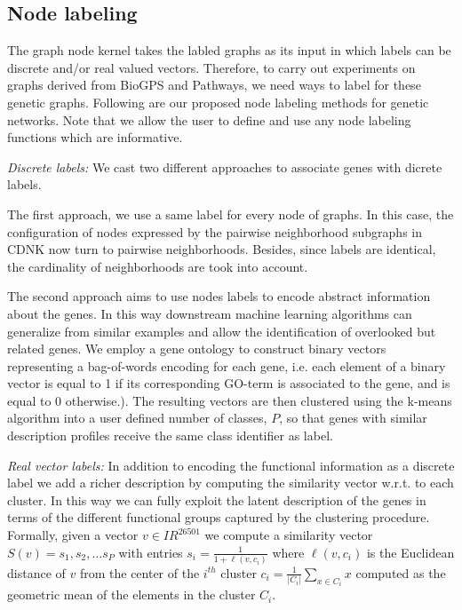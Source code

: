 \documentclass[review]{elsarticle}
\begin{document}
\subsection{Node labeling} 
\label{sec:lab}
The graph node kernel takes the labled graphs as its input in which labels can be discrete and/or real valued vectors. Therefore, to carry out experiments on graphs derived from BioGPS and Pathways, we need ways to label for these genetic graphs. Following are our proposed node labeling methods for genetic networks. Note that we allow the user to define and use any node labeling functions which are informative.

\textit{Discrete labels:} We cast two different approaches to associate genes with dicrete labels.

The first approach, we use a same label for every node of graphs. In this case, the configuration of nodes expressed by the pairwise neighborhood subgraphs in CDNK now turn to pairwise neighborhoods. Besides, since labels are identical, the cardinality of neighborhoods are took into account.

The second approach aims to use nodes labels to encode abstract information about the genes. In this way downstream machine learning algorithms can generalize from similar examples and allow the identification of overlooked but related genes. We employ a gene ontology \cite{gene2004gene} to construct binary vectors representing a bag-of-words encoding for each gene, i.e. each element of a binary vector is equal to 1 if its corresponding GO-term is associated to the gene, and is equal to 0 otherwise.). The resulting vectors are then clustered using the k-means algorithm into a user defined number of classes, $P$, so that genes with similar description profiles receive the same class identifier as label.

\textit{Real vector labels:} In addition to encoding the functional information as a discrete label we add a richer description by computing the similarity vector w.r.t. to each cluster. In this way we can fully exploit the latent description of the genes in terms of the different functional groups captured by the clustering procedure. Formally, given a vector $v \in I\!R^{26501}$ we compute a similarity vector $S(v)= {s_1, s_2, \ldots s_P}$ with entries $s_i = \frac{1}{1+ \ell(v,c_i)}$ where $\ell(v,c_i)$ is the Euclidean distance of $v$ from the center of the $i^{th}$ cluster $c_i = \frac{1}{|C_i|}\sum_{x \in C_i} x$ computed as the geometric mean of the elements in the cluster $C_i$.
\end{document}
